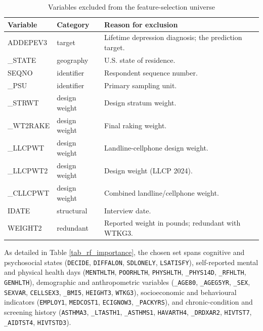 \documentclass[conference]{IEEEtran}
\begin{document}
\begin{table}[!htbp]
\caption{Variables excluded from the feature-selection universe}
\label{tab:excluded}
\centering
\scriptsize
\setlength{\tabcolsep}{3pt}
\renewcommand{\arraystretch}{1.1}
\begin{tabular}{|l|l|p{4.5cm}|}
\hline
\textbf{Variable} & \textbf{Category} & \textbf{Reason for exclusion} \\
\hline
ADDEPEV3   & target        & Lifetime depression diagnosis; the prediction target. \\
\_STATE    & geography     & U.S. state of residence. \\
SEQNO      & identifier    & Respondent sequence number. \\
\_PSU      & identifier    & Primary sampling unit. \\
\_STRWT    & design weight & Design stratum weight. \\
\_WT2RAKE  & design weight & Final raking weight. \\
\_LLCPWT   & design weight & Landline-cellphone design weight. \\
\_LLCPWT2  & design weight & Design weight (LLCP 2024). \\
\_CLLCPWT  & design weight & Combined landline/cellphone weight. \\
IDATE      & structural    & Interview date. \\
WEIGHT2    & redundant     & Reported weight in pounds; redundant with WTKG3. \\
\hline
\end{tabular}
\end{table}

As detailed in Table \ref{tab_rf_importance}, the chosen set spans cognitive and psychosocial states (\texttt{DECIDE}, \texttt{DIFFALON}, \texttt{SDLONELY}, \texttt{LSATISFY}), self-reported mental and physical health days (\texttt{MENTHLTH}, \texttt{POORHLTH}, \texttt{PHYSHLTH}, \texttt{\_PHYS14D}, \texttt{\_RFHLTH}, \texttt{GENHLTH}), demographic and anthropometric variables (\texttt{\_AGE80}, \texttt{\_AGEG5YR}, \texttt{\_SEX}, \texttt{SEXVAR}, \texttt{CELLSEX3}, \texttt{\_BMI5}, \texttt{HEIGHT3}, \texttt{WTKG3}), socioeconomic and behavioural indicators (\texttt{EMPLOY1}, \texttt{MEDCOST1}, \texttt{ECIGNOW3}, \texttt{\_PACKYRS}), and chronic-condition and screening history (\texttt{ASTHMA3}, \texttt{\_LTASTH1}, \texttt{\_ASTHMS1}, \texttt{HAVARTH4}, \texttt{\_DRDXAR2}, \texttt{HIVTST7}, \texttt{\_AIDTST4}, \texttt{HIVTSTD3}).
\end{document}
